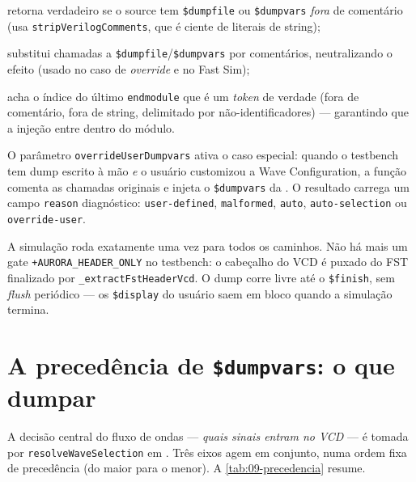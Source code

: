 \begin{description}[leftmargin=*]
  \item[\lstinline|hasUserDumpCalls(src)|] retorna verdadeiro se o source tem
    \lstinline|$dumpfile| ou \lstinline|$dumpvars| \emph{fora} de comentário
    (usa \lstinline|stripVerilogComments|, que é ciente de literais de string);
  \item[\lstinline|commentOutDumpCalls(src)|] substitui chamadas a
    \lstinline|$dumpfile|/\lstinline|$dumpvars| por comentários, neutralizando o
    efeito (usado no caso de \emph{override} e no Fast Sim);
  \item[\lstinline|lastEndmoduleIndex(src)|] acha o índice do último
    \lstinline|endmodule| que é um \emph{token} de verdade (fora de comentário,
    fora de string, delimitado por não-identificadores) --- garantindo que a
    injeção entre dentro do módulo.
\end{description}

O parâmetro \lstinline|overrideUserDumpvars| ativa o caso especial: quando o
testbench tem dump escrito à mão \emph{e} o usuário customizou a Wave
Configuration, a função comenta as chamadas originais e injeta o
\lstinline|$dumpvars| da . O resultado carrega um campo
\lstinline|reason| diagnóstico: \lstinline|user-defined|, \lstinline|malformed|,
\lstinline|auto|, \lstinline|auto-selection| ou \lstinline|override-user|.

\begin{nota}
A simulação roda exatamente uma vez para todos os caminhos. Não há mais um
gate \lstinline|+AURORA_HEADER_ONLY| no testbench: o cabeçalho do VCD é puxado
do FST finalizado por \lstinline|_extractFstHeaderVcd|. O dump corre livre até o
\lstinline|$finish|, sem \emph{flush} periódico --- os \lstinline|$display| do
usuário saem em bloco quando a simulação termina.
\end{nota}

\section{A precedência de \texttt{\$dumpvars}: o que dumpar}

A decisão central do fluxo de ondas --- \emph{quais sinais entram no VCD} --- é
tomada por \lstinline|resolveWaveSelection| em
. Três eixos agem em conjunto,
numa ordem fixa de precedência (do maior para o menor). A
\autoref{tab:09-precedencia} resume.

